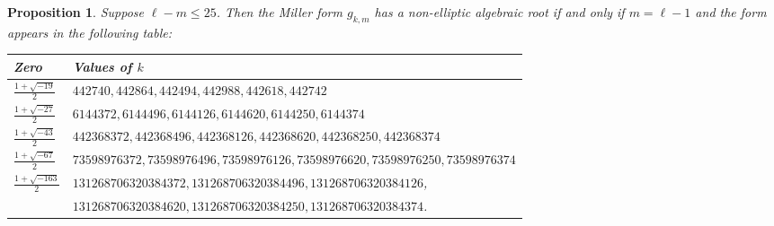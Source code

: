 \documentclass[12pt]{amsart}
\theoremstyle{plain} %
\newtheorem{proposition}[theorem]{Proposition}
\theoremstyle{definition}
\theoremstyle{remark}
\numberwithin{equation}{section}
\begin{document}
\begin{proposition}\label{l:m1algebraic}
Suppose $\ell-m\leq 25$. 
Then the Miller form $g_{k,m}$ has a non-elliptic algebraic root if and only if $m=\ell-1$ and the form appears in the following table:
\begin{center}
\begin{tabular}{ll}
  Zero & Values of $k$\\
  \hline
  $\frac{1+\sqrt{-19}}{2}$&$442740, 442864, 442494, 442988, 442618, 442742$\\
  $\frac{1+\sqrt{-27}}{2}$&$6144372, 6144496, 6144126, 6144620, 6144250, 6144374$\\
  $\frac{1+\sqrt{-43}}{2}$&$442368372, 442368496, 442368126, 442368620, 442368250, 442368374$\\  
  $\frac{1+\sqrt{-67}}{2}$&$73598976372, 73598976496, 73598976126, 73598976620, 73598976250, 73598976374$\\  
  $\frac{1+\sqrt{-163}}{2}$&$131268706320384372,
                             131268706320384496,
                             131268706320384126$, \\
  &$131268706320384620, 131268706320384250, 131268706320384374$.  
\end{tabular}
\end{center}
\end{proposition}
\end{document}
